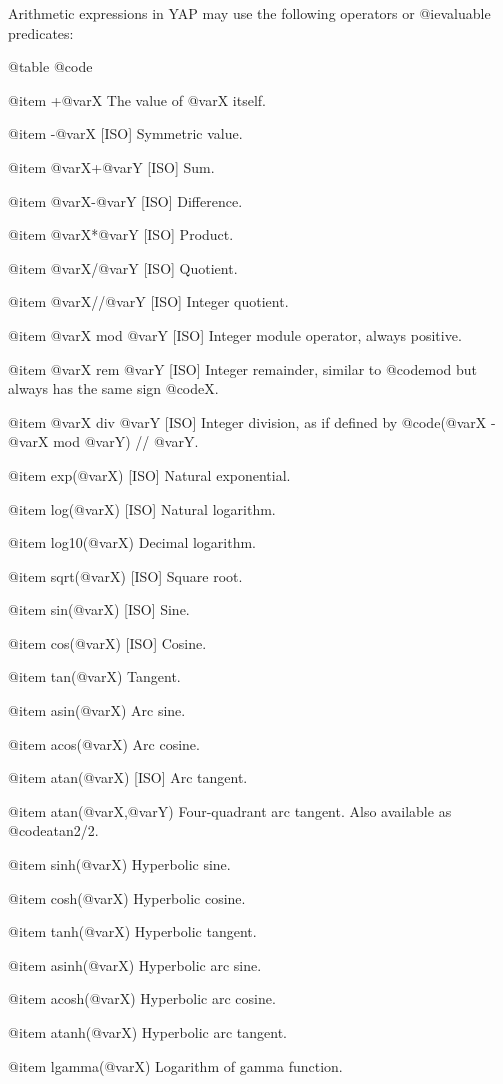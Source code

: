 {{{{Arithmetic expressions in YAP may use the following operators or
@i{evaluable predicates}:

@table @code

@item +@var{X}
The value of @var{X} itself.

@item -@var{X} [ISO]
Symmetric value.

@item @var{X}+@var{Y} [ISO]
Sum.

@item @var{X}-@var{Y} [ISO]
Difference.

@item @var{X}*@var{Y} [ISO]
Product.

@item @var{X}/@var{Y} [ISO]
Quotient.

@item @var{X}//@var{Y} [ISO]
Integer quotient.

@item @var{X} mod @var{Y} [ISO]
Integer module operator, always positive.

@item @var{X} rem @var{Y} [ISO]
Integer remainder, similar to @code{mod} but always has the same sign
@code{X}.

@item @var{X} div @var{Y} [ISO]
Integer division, as if defined by @code{(@var{X} - @var{X} mod @var{Y})
// @var{Y}}.

@item exp(@var{X}) [ISO]
Natural exponential.

@item log(@var{X}) [ISO]
Natural logarithm.

@item log10(@var{X})
Decimal logarithm.

@item sqrt(@var{X}) [ISO]
Square root.

@item sin(@var{X}) [ISO]
Sine.

@item cos(@var{X}) [ISO]
Cosine.

@item tan(@var{X})
Tangent.

@item asin(@var{X})
Arc sine.

@item acos(@var{X})
Arc cosine.

@item atan(@var{X}) [ISO]
Arc tangent.

@item atan(@var{X},@var{Y})
Four-quadrant arc tangent. Also available as @code{atan2/2}.

@item sinh(@var{X})
Hyperbolic sine.

@item cosh(@var{X})
Hyperbolic cosine.

@item tanh(@var{X})
Hyperbolic tangent.

@item asinh(@var{X})
Hyperbolic arc sine.

@item acosh(@var{X})
Hyperbolic arc cosine.

@item atanh(@var{X})
Hyperbolic arc tangent.

@item lgamma(@var{X})
Logarithm of gamma function.

}}}}
